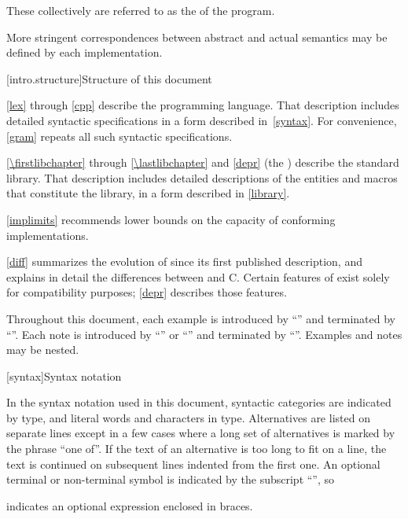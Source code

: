 These collectively are referred to as the
 of the program.
\begin{note}
More stringent correspondences between abstract and actual
semantics may be defined by each implementation.
\end{note}

[intro.structure]{Structure of this document}

\pnum
{}%
%
\ref{lex} through \ref{cpp} describe the \Cpp{} programming
language. That description includes detailed syntactic specifications in
a form described in~\ref{syntax}. For convenience, \ref{gram}
repeats all such syntactic specifications.

\pnum
\ref{\firstlibchapter} through \ref{\lastlibchapter} and \ref{depr}
(the ) describe the \Cpp{} standard library.
That description includes detailed descriptions of the
entities and macros
that constitute the library, in a form described in \ref{library}.

\pnum
\ref{implimits} recommends lower bounds on the capacity of conforming
implementations.

\pnum
\ref{diff} summarizes the evolution of \Cpp{} since its first
published description, and explains in detail the differences between
\Cpp{} and C\@. Certain features of \Cpp{} exist solely for compatibility
purposes; \ref{depr} describes those features.

\pnum
Throughout this document, each example is introduced by
``'' and terminated by ``''. Each note is
introduced by ``'' or ``'' and
terminated by ``''. Examples
and notes may be nested.%

[syntax]{Syntax notation}

\pnum
{}%
In the syntax notation used in this document, syntactic
categories are indicated by  type, and literal words
and characters in   type. Alternatives are
listed on separate lines except in a few cases where a long set of
alternatives is marked by the phrase ``one of''. If the text of an alternative is too long to fit on a line, the text is continued on subsequent lines indented from the first one.
An optional terminal or non-terminal symbol is indicated by the subscript
``\opt{\relax}'', so
\begin{ncbnf}
\terminal{\{}  \terminal{\}}
\end{ncbnf}
indicates an optional expression enclosed in braces.%


